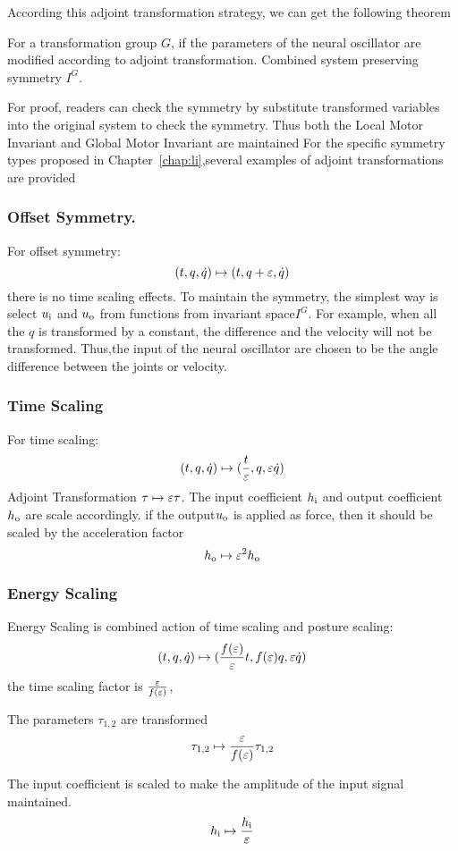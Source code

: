 According this adjoint transformation strategy, we can get the following theorem
\begin{mythe}
For a transformation group $G$, if the parameters of the neural oscillator are modified according to adjoint transformation.
Combined system preserving symmetry $I^G$.
\end{mythe}
For proof, readers can check the symmetry by substitute transformed variables into the original system to check the symmetry.
Thus both the Local Motor Invariant and Global Motor Invariant are maintained
For the specific symmetry types proposed in Chapter~\ref{chap:li},several examples of adjoint transformations are provided


\subsubsection*{ Offset Symmetry.}
For offset symmetry:
\[
(t,q,\dot{q}) \mapsto (t,q+\varepsilon,\dot{q})
\]
there is no time scaling effects.
To maintain the symmetry,  the simplest way is select $u_{\mathrm{i}}$ and $u_{\mathrm{o}}$ from functions from invariant space$I^G$.
For example, when all the $q$ is transformed by a constant, the difference and the velocity will not be transformed. 
Thus,the input of the neural oscillator are chosen to be the angle difference between the joints or velocity.



\subsubsection*{Time Scaling}
For time scaling:
\[
(t,q,\dot{q}) \mapsto (\frac{t}{\varepsilon},q,\varepsilon \dot{q})
\]
Adjoint Transformation
$\tau \mapsto \varepsilon \tau $.
The input coefficient $h_{\mathrm{i}}$ and output coefficient $h_{\mathrm{o}}$ are scale accordingly.
if the output$u_{\mathrm{o}}$ is applied as force, then it should be scaled by the acceleration factor
\[
 h_{\mathrm{o}} \mapsto \varepsilon^2 h_{\mathrm{o}}
\]
\subsubsection*{ Energy Scaling}
Energy Scaling is combined action of time scaling and posture scaling:
\[
(t,q,\dot{q} ) \mapsto ( \frac{f(\varepsilon)}{\varepsilon}t ,f(\varepsilon)q,\varepsilon\dot{q})
\]
the time scaling factor is $\frac{\varepsilon}{f(\varepsilon)}$, 

The parameters $\tau_{1,2}$ are transformed
\[
\tau_{1,2} \mapsto \frac{\varepsilon}{f(\varepsilon)} \tau_{1,2}
\]

The input coefficient is scaled to make the amplitude of the input signal maintained.
\[
h_{\mathrm{i}} \mapsto \frac{h_{\mathrm{i}}}{\varepsilon}
\]

